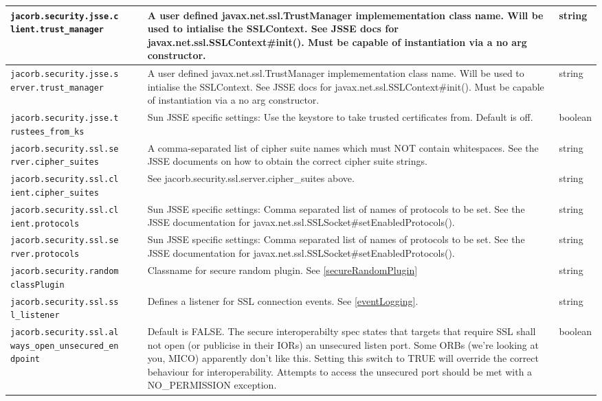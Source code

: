 \begin{small}
\begin{longtable}{|p{5cm}|p{9cm}|p{2cm}|}
\hline
\verb"jacorb.security.jsse.c"
\verb"lient.trust_manager" & A user defined javax.net.ssl.TrustManager implemementation class name. Will be used to intialise the SSLContext. See JSSE docs for javax.net.ssl.SSLContext\#init(). Must be capable of instantiation via a no arg constructor. & string \\
\hline
\verb"jacorb.security.jsse.s"
\verb"erver.trust_manager" & A user defined javax.net.ssl.TrustManager implemementation class name. Will be used to intialise the SSLContext. See JSSE docs for javax.net.ssl.SSLContext\#init(). Must be capable of instantiation via a no arg constructor. & string \\
\hline
\verb"jacorb.security.jsse.t"
\verb"rustees_from_ks" & Sun JSSE specific settings: Use the keystore to take trusted certificates from. Default is off. & boolean \\
\hline
\verb"jacorb.security.ssl.se"
\verb"rver.cipher_suites" & A comma-separated list of cipher suite names which must NOT contain whitespaces. See the JSSE documents on how to obtain the correct cipher suite strings. & string \\
\hline
\verb"jacorb.security.ssl.cl"
\verb"ient.cipher_suites" & See jacorb.security.ssl.server.cipher\_suites above. & string \\
\hline
\verb"jacorb.security.ssl.cl"
\verb"ient.protocols" & Sun JSSE specific settings: Comma separated list of names of protocols to be set. See the JSSE documentation for javax.net.ssl.SSLSocket\#setEnabledProtocols(). & string \\
\hline
\verb"jacorb.security.ssl.se"
\verb"rver.protocols" & Sun JSSE specific settings: Comma separated list of names of protocols to be set. See the JSSE documentation for javax.net.ssl.SSLSocket\#setEnabledProtocols(). & string \\
\hline
\verb"jacorb.security.random"
\verb"classPlugin" & Classname for secure random plugin. See \ref{secureRandomPlugin} & string \\
\hline
\verb"jacorb.security.ssl.ss"
\verb"l_listener" & Defines a listener for SSL connection events. See \ref{eventLogging}.
& string \\
\hline
\verb"jacorb.security.ssl.al"
\verb"ways_open_unsecured_en"
\verb"dpoint" &  Default is FALSE. The secure interoperabilty spec states that targets that require SSL shall not open (or publicise in their IORs) an unsecured listen port. Some ORBs (we're looking at you, MICO) apparently don't like this. Setting this switch to TRUE will override the correct behaviour for interoperability. Attempts to access the unsecured port should be met with a NO\_PERMISSION exception. & boolean \\
\hline
\end{longtable}
\end{small}


